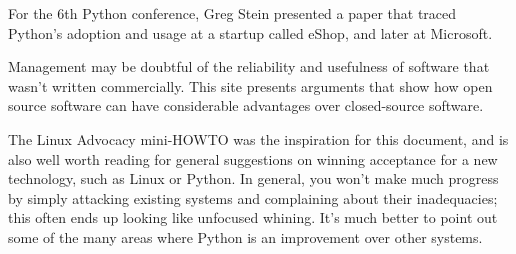 \documentclass{howto}
\begin{document}
\begin{definitions}


For the 6th Python conference, Greg Stein presented a paper that
traced Python's adoption and usage at a startup called eShop, and
later at Microsoft.


Management may be doubtful of the reliability and usefulness of
software that wasn't written commercially.  This site presents
arguments that show how open source software can have considerable
advantages over closed-source software.


The Linux Advocacy mini-HOWTO was the inspiration for this document,
and is also well worth reading for general suggestions on winning
acceptance for a new technology, such as Linux or Python.  In general,
you won't make much progress by simply attacking existing systems and
complaining about their inadequacies; this often ends up looking like
unfocused whining.  It's much better to point out some of the many
areas where Python is an improvement over other systems.  

\end{definitions}
\end{document}
